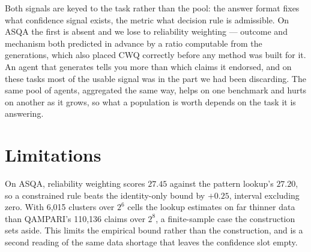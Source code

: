 \documentclass[11pt]{article}
\begin{document}
Both signals are keyed to the task rather than the pool: the answer format fixes what confidence signal exists, the metric what decision rule is admissible. On ASQA the first is absent and we lose to reliability weighting --- outcome and mechanism both predicted in advance by a ratio computable from the generations, which also placed CWQ correctly before any method was built for it. An agent that generates tells you more than which claims it endorsed, and on these tasks most of the usable signal was in the part we had been discarding. The same pool of agents, aggregated the same way, helps on one benchmark and hurts on another as it grows, so what a population is worth depends on the task it is answering.

\section*{Limitations}
\label{sec:limitations}

On ASQA, reliability weighting scores $27.45$ against the pattern lookup's $27.20$, so a constrained rule beats the identity-only bound by $+0.25$, interval excluding zero. With 6,015 clusters over $2^6$ cells the lookup estimates on far thinner data than QAMPARI's 110,136 claims over $2^8$, a finite-sample case the construction sets aside. This limits the empirical bound rather than the construction, and is a second reading of the same data shortage that leaves the confidence slot empty. %
\end{document}

